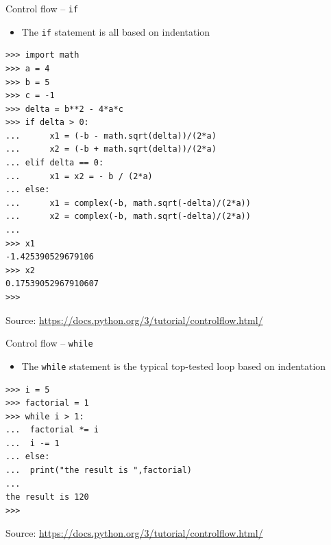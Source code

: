 \documentclass{beamer}
\begin{document}
\begin{frame}[fragile]
{\centerline{Control flow -- \texttt{if}}}
\begin{itemize}
    \item The \texttt{if} statement is all based on indentation
\end{itemize}
\begin{lstlisting}[style=myPythonStyle]
>>> import math
>>> a = 4
>>> b = 5
>>> c = -1
>>> delta = b**2 - 4*a*c
>>> if delta > 0:
...      x1 = (-b - math.sqrt(delta))/(2*a)
...      x2 = (-b + math.sqrt(delta))/(2*a)
... elif delta == 0:
...      x1 = x2 = - b / (2*a)
... else:
...      x1 = complex(-b, math.sqrt(-delta)/(2*a))
...      x2 = complex(-b, math.sqrt(-delta)/(2*a))
... 
>>> x1
-1.425390529679106
>>> x2
0.17539052967910607
>>> 
\end{lstlisting}

\begin{center}
\tiny Source: \url{https://docs.python.org/3/tutorial/controlflow.html/}
\end{center}

\end{frame}


\begin{frame}[fragile]
{\centerline{Control flow -- \texttt{while}}}
\begin{itemize}
    \item The \texttt{while} statement is the typical top-tested loop based on indentation
\end{itemize}
\begin{lstlisting}[style=myPythonStyle]
>>> i = 5
>>> factorial = 1
>>> while i > 1:
...  factorial *= i
...  i -= 1
... else: 
...  print("the result is ",factorial)
... 
the result is 120
>>> 
\end{lstlisting}

\begin{center}
\tiny Source: \url{https://docs.python.org/3/tutorial/controlflow.html/}
\end{center}

\end{frame}
\end{document}

